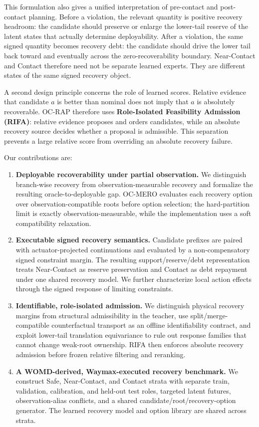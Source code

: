 \documentclass{article} %
\begin{document}
This formulation also gives a unified interpretation of pre-contact and post-contact planning. Before a violation, the relevant quantity is positive recovery headroom: the candidate should preserve or enlarge the lower-tail reserve of the latent states that actually determine deployability. After a violation, the same signed quantity becomes recovery debt: the candidate should drive the lower tail back toward and eventually across the zero-recoverability boundary. Near-Contact and Contact therefore need not be separate learned experts. They are different states of the same signed recovery object.

A second design principle concerns the role of learned scores. Relative evidence that candidate $a$ is better than nominal does not imply that $a$ is absolutely recoverable. OC-RAP therefore uses \textbf{Role-Isolated Feasibility Admission (RIFA)}: relative evidence proposes and orders candidates, while an absolute recovery source decides whether a proposal is admissible. This separation prevents a large relative score from overriding an absolute recovery failure.

Our contributions are:
\begin{enumerate}[leftmargin=*]
    \item \textbf{Deployable recoverability under partial observation.} We distinguish branch-wise recovery from observation-measurable recovery and formalize the resulting oracle-to-deployable gap. OC-MERO evaluates each recovery option over observation-compatible roots before option selection; the hard-partition limit is exactly observation-measurable, while the implementation uses a soft compatibility relaxation.
    \item \textbf{Executable signed recovery semantics.} Candidate prefixes are paired with actuator-projected continuations and evaluated by a non-compensatory signed constraint margin. The resulting support/reserve/debt representation treats Near-Contact as reserve preservation and Contact as debt repayment under one shared recovery model. We further characterize local action effects through the signed response of limiting constraints.
    \item \textbf{Identifiable, role-isolated admission.} We distinguish physical recovery margins from structural admissibility in the teacher, use split/merge-compatible counterfactual transport as an offline identifiability contract, and exploit lower-tail translation equivariance to rule out response families that cannot change weak-root ownership. RIFA then enforces absolute recovery admission before frozen relative filtering and reranking.
    \item \textbf{A WOMD-derived, Waymax-executed recovery benchmark.} We construct Safe, Near-Contact, and Contact strata with separate train, validation, calibration, and held-out test roles, targeted latent futures, observation-alias conflicts, and a shared candidate/root/recovery-option generator. The learned recovery model and option library are shared across strata.
\end{enumerate}
\end{document}
